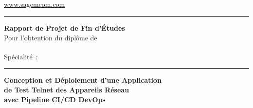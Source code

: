 \begin{titlepage}

\begin{minipage}[c]{0.45\textwidth}
  \centering
  \fbox{\parbox{4cm}{\centering\vspace{0.4cm}
    {\small [Logo de l'École]}\vspace{0.4cm}}}\\[0.3cm]
  {\bfseries\small \ecole}\\[0.1cm]
  {\small \departement}
\end{minipage}
\hfill
\begin{minipage}[c]{0.45\textwidth}
  \centering
  \fbox{\parbox{4cm}{\centering\vspace{0.4cm}
    {\small [Logo Sagemcom]}\vspace{0.4cm}}}\\[0.3cm]
  {\bfseries\small \entreprise}\\[0.1cm]
  {\small\textcolor{mainblue}{\url{www.sagemcom.com}}}
\end{minipage}

\vspace{0.6cm}
{\color{mainblue}\rule{\textwidth}{1.5pt}}
\vspace{0.5cm}

\begin{center}
  {\Huge\bfseries\color{mainblue} Rapport de Projet de Fin d'Études}\\[0.5cm]
  {\large Pour l'obtention du diplôme de}\\[0.3cm]
  {\large\bfseries \diplome}\\[0.2cm]
  {\normalsize Spécialité~: \specialite}
\end{center}

\vspace{0.4cm}
{\color{mainblue}\rule{\textwidth}{0.8pt}}
\vspace{0.5cm}

\begin{tcolorbox}[
  enhanced,
  colback  = lightblue,
  colframe = mainblue,
  boxrule  = 1.5pt,
  arc      = 4pt,
  left     = 12pt, right  = 12pt,
  top      = 10pt, bottom = 10pt,
]
  \centering
  {\LARGE\bfseries\color{mainblue}
   Conception et Déploiement d'une Application\\[0.3cm]
   de Test Telnet des Appareils Réseau\\[0.3cm]
   avec Pipeline CI/CD DevOps}
\end{tcolorbox}


\end{titlepage}
